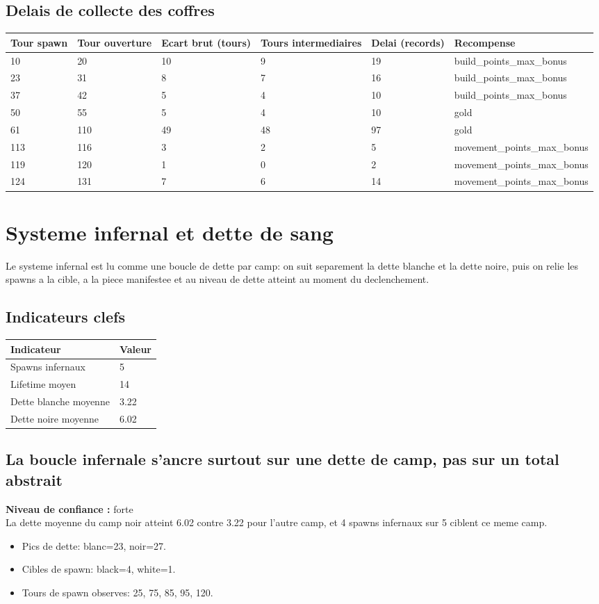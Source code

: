 \documentclass[11pt,a4paper]{article}
\begin{document}
\subsection*{Delais de collecte des coffres}
\begin{tabularx}{\linewidth}{X|X|X|X|X|X}
\toprule
Tour spawn & Tour ouverture & Ecart brut (tours) & Tours intermediaires & Delai (records) & Recompense \\
\midrule
10 & 20 & 10 & 9 & 19 & build\_points\_max\_bonus \\
23 & 31 & 8 & 7 & 16 & build\_points\_max\_bonus \\
37 & 42 & 5 & 4 & 10 & build\_points\_max\_bonus \\
50 & 55 & 5 & 4 & 10 & gold \\
61 & 110 & 49 & 48 & 97 & gold \\
113 & 116 & 3 & 2 & 5 & movement\_points\_max\_bonus \\
119 & 120 & 1 & 0 & 2 & movement\_points\_max\_bonus \\
124 & 131 & 7 & 6 & 14 & movement\_points\_max\_bonus \\
\bottomrule
\end{tabularx}
\section{Systeme infernal et dette de sang}
Le systeme infernal est lu comme une boucle de dette par camp: on suit separement la dette blanche et la dette noire, puis on relie les spawns a la cible, a la piece manifestee et au niveau de dette atteint au moment du declenchement.
\subsection*{Indicateurs clefs}
\begin{tabularx}{\linewidth}{lX}
\toprule
Indicateur & Valeur \\
\midrule
Spawns infernaux & 5 \\
Lifetime moyen & 14 \\
Dette blanche moyenne & 3.22 \\
Dette noire moyenne & 6.02 \\
\bottomrule
\end{tabularx}
\subsection*{La boucle infernale s'ancre surtout sur une dette de camp, pas sur un total abstrait}
\textbf{Niveau de confiance :} forte\\
La dette moyenne du camp noir atteint 6.02 contre 3.22 pour l'autre camp, et 4 spawns infernaux sur 5 ciblent ce meme camp.
\begin{itemize}
\item Pics de dette: blanc=23, noir=27.
\item Cibles de spawn: black=4, white=1.
\item Tours de spawn observes: 25, 75, 85, 95, 120.
\end{itemize}
\end{document}
